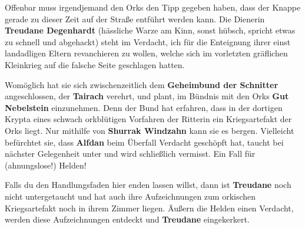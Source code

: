 Offenbar muss irgendjemand den Orks den Tipp gegeben haben, dass der Knappe gerade zu dieser Zeit auf der Straße entführt werden kann.
Die Dienerin \textbf{Treudane Degenhardt} (hässliche Warze am Kinn, sonst hübsch, spricht etwas zu schnell und abgehackt) steht im Verdacht, 
ich für die Enteignung ihrer einst landadligen Eltern revanchieren zu wollen, welche sich im vorletzten gräflichen Kleinkrieg auf die falsche Seite geschlagen hatten.

Womöglich hat sie sich zwischenzeitlich dem \textbf{Geheimbund der Schnitter} angeschlossen, der \textbf{Tairach} verehrt, und plant, im Bündnis mit den Orks \textbf{Gut Nebelstein} einzunehmen.
Denn der Bund hat erfahren, dass in der dortigen Krypta eines schwach orkblütigen Vorfahren der Ritterin ein Kriegsartefakt der Orks liegt.
Nur mithilfe von \textbf{Shurrak Windzahn} kann sie es bergen. Vielleicht befürchtet sie, dass \textbf{Alfdan} beim Überfall Verdacht geschöpft hat, taucht bei nächster Gelegenheit unter und wird schließlich vermisst.
Ein Fall für (ahnungslose!) Helden!


Falls du den Handlungsfaden hier enden lassen willst, dann ist \textbf{Treudane} noch nicht untergetaucht und hat auch ihre Aufzeichnungen zum orkischen Kriegsartefakt noch in ihrem Zimmer liegen.
Äußern die Helden einen Verdacht, werden diese Aufzeichnungen entdeckt und \textbf{Treudane} eingekerkert.


\spaltenende

\neueseite


\spaltenanfang



	

